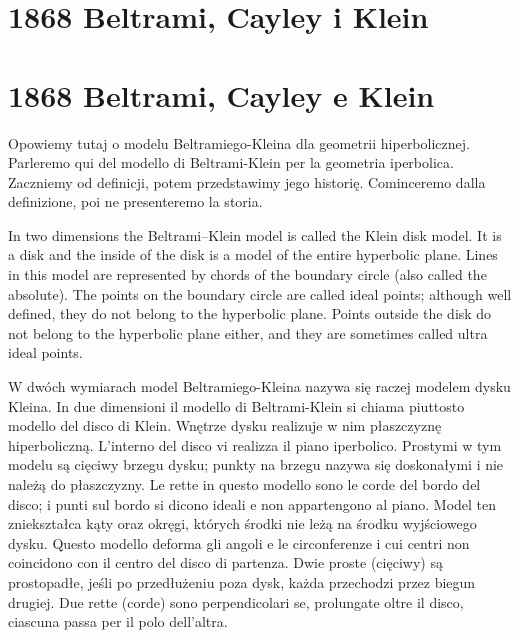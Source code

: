 \section{1868 Beltrami, Cayley i Klein} %
\section{1868 Beltrami, Cayley e Klein} %
\label{sekcja_beltrami_cayley_klein}
Opowiemy tutaj o modelu Beltramiego-Kleina dla geometrii hiperbolicznej. %
Parleremo qui del modello di Beltrami-Klein per la geometria iperbolica. %
Zaczniemy od definicji, potem przedstawimy jego historię. %
Cominceremo dalla definizione, poi ne presenteremo la storia. %

In two dimensions the Beltrami–Klein model is called the Klein disk model. It is a disk and the inside of the disk is a model of the entire hyperbolic plane. Lines in this model are represented by chords of the boundary circle (also called the absolute). The points on the boundary circle are called ideal points; although well defined, they do not belong to the hyperbolic plane. Points outside the disk do not belong to the hyperbolic plane either, and they are sometimes called ultra ideal points.



W dwóch wymiarach model Beltramiego-Kleina nazywa się raczej modelem dysku Kleina. %
In due dimensioni il modello di Beltrami-Klein si chiama piuttosto modello del disco di Klein. %
Wnętrze dysku realizuje w nim płaszczyznę hiperboliczną. %
L'interno del disco vi realizza il piano iperbolico. %
Prostymi w tym modelu są cięciwy brzegu dysku; punkty na brzegu nazywa się doskonałymi i nie należą do płaszczyzny. %
Le rette in questo modello sono le corde del bordo del disco; i punti sul bordo si dicono ideali e non appartengono al piano. %
Model ten zniekształca kąty oraz okręgi, których środki nie leżą na środku wyjściowego dysku. %
Questo modello deforma gli angoli e le circonferenze i cui centri non coincidono con il centro del disco di partenza. %
Dwie proste (cięciwy) są prostopadłe, jeśli po przedłużeniu poza dysk, każda przechodzi przez biegun drugiej. %
Due rette (corde) sono perpendicolari se, prolungate oltre il disco, ciascuna passa per il polo dell'altra. %


